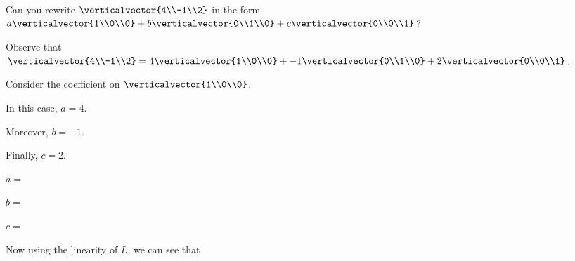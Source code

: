 \documentclass{ximera}
\begin{document}
\begin{question}
\begin{solution}
\begin{hint}
  		\begin{question}
  			Can you rewrite $\verticalvector{4\\-1\\2}$ in the form $a\verticalvector{1\\0\\0}+b\verticalvector{0\\1\\0}+c\verticalvector{0\\0\\1}$?
  			\begin{solution}
  				\begin{hint}
  					Observe that $\verticalvector{4\\-1\\2} = 4\verticalvector{1\\0\\0}+-1\verticalvector{0\\1\\0}+2\verticalvector{0\\0\\1}$.
  				\end{hint}
  				\begin{hint}
  					Consider the coefficient on $\verticalvector{1\\0\\0}$.
  				\end{hint}
  				\begin{hint}
  					In this case, $a = 4$.
  				\end{hint}
  				\begin{hint}
  					Moreover, $b = -1$.
  				\end{hint}
  				\begin{hint}
  					Finally, $c = 2$.
  				\end{hint}
  				$a =$ 
  			\end{solution}
  			\begin{solution}
  				$b=$ \answer{-1}
  			\end{solution}
  			\begin{solution}
  				$c=$ \answer{2}
  			\end{solution}
  		
  		Now using the linearity of $L$, we can see that 
  		

\end{question}
\end{hint}
\end{solution}
\end{question}
\end{document}

